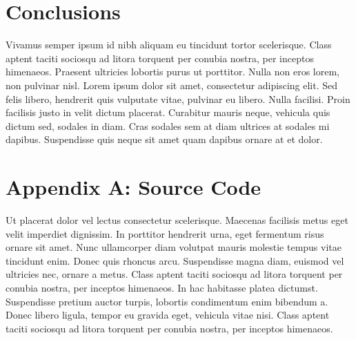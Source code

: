 \documentclass{sydeStyle}
\begin{document}
\section*{Conclusions}
Vivamus semper ipsum id nibh aliquam eu tincidunt tortor scelerisque. Class
aptent taciti sociosqu ad litora torquent per conubia nostra, per inceptos
himenaeos. Praesent ultricies lobortis purus ut porttitor. Nulla non eros
lorem, non pulvinar nisl. Lorem ipsum dolor sit amet, consectetur
adipiscing elit. Sed felis libero, hendrerit quis vulputate vitae, pulvinar
eu libero. Nulla facilisi. Proin facilisis justo in velit dictum placerat.
Curabitur mauris neque, vehicula quis dictum sed, sodales in diam. Cras
sodales sem at diam ultrices at sodales mi dapibus. Suspendisse quis neque
sit amet quam dapibus ornare at et dolor.

\section*{Appendix A: Source Code}
Ut placerat dolor vel lectus consectetur scelerisque. Maecenas facilisis
metus eget velit imperdiet dignissim. In porttitor hendrerit urna, eget
fermentum risus ornare sit amet. Nunc ullamcorper diam volutpat mauris
molestie tempus vitae tincidunt enim. Donec quis rhoncus arcu. Suspendisse
magna diam, euismod vel ultricies nec, ornare a metus. Class aptent taciti
sociosqu ad litora torquent per conubia nostra, per inceptos himenaeos. In
hac habitasse platea dictumst. Suspendisse pretium auctor turpis, lobortis
condimentum enim bibendum a. Donec libero ligula, tempor eu gravida eget,
vehicula vitae nisi. Class aptent taciti sociosqu ad litora torquent per
conubia nostra, per inceptos himenaeos.
\end{document}
